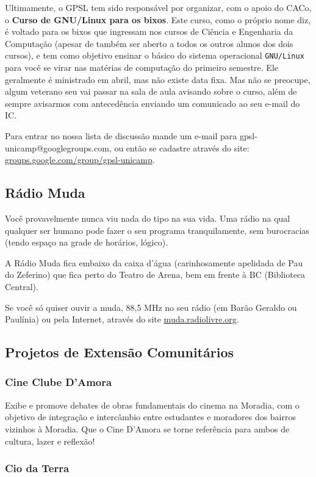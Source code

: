 Ultimamente, o GPSL tem sido responsável por organizar, com o apoio do
CACo, o \textbf{Curso de GNU/Linux para os bixos}. Este curso, como o
próprio nome diz, é voltado para os bixos que ingressam nos cursos de
Ciência e Engenharia da Computação (apesar de também ser aberto a todos
os outros alunos dos dois cursos), e tem como objetivo ensinar o
básico do sistema operacional \texttt{GNU/Linux} para você se virar
nas matérias de computação do primeiro semestre. Ele geralmente é
ministrado em abril, mas não existe data fixa. Mas não se preocupe,
algum veterano seu vai passar na sala de aula avisando sobre o curso,
além de sempre avisarmos com antecedência enviando um comunicado ao
seu e-mail do IC.

Para entrar no nossa lista de discussão mande um e-mail para
gpsl-unicamp@googlegroups.com, ou então se cadastre através do site:
\url{groups.google.com/group/gpsl-unicamp}.

\subsection{Rádio Muda}

Você provavelmente nunca viu nada do tipo na sua vida. Uma rádio na qual
qualquer ser humano pode fazer o seu programa tranquilamente, sem burocracias
(tendo espaço na grade de horários, lógico).

A Rádio Muda fica embaixo da caixa d'água (carinhosamente apelidada de Pau do
Zeferino) que fica perto do Teatro de Arena, bem em frente à BC (Biblioteca
Central).

Se você só quiser ouvir a muda, 88,5 MHz no seu rádio (em Barão Geraldo ou
Paulínia) ou pela Internet, através do site \url{muda.radiolivre.org}.

\subsection{Projetos de Extensão Comunitários}

\subsubsection{Cine Clube D'Amora}

Exibe e promove debates de obras fundamentais do cinema na Moradia, com
o objetivo de integração e intercâmbio entre estudantes e moradores dos bairros
vizinhos à Moradia. Que o Cine D'Amora se torne referência para ambos de
cultura, lazer e reflexão!

\subsubsection{Cio da Terra}

